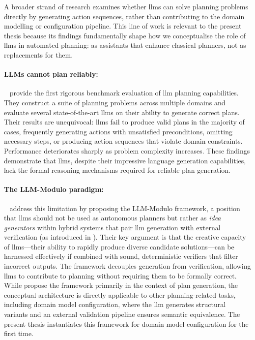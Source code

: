 A broader strand of research examines whether \glspl{llm} can solve planning problems directly by generating action sequences, rather than contributing to the domain modelling or configuration pipeline.
This line of work is relevant to the present thesis because its findings fundamentally shape how we conceptualise the role of \glspl{llm} in automated planning: as assistants that enhance classical planners, not as replacements for them.

\paragraph{LLMs cannot plan reliably:}
\citeauthor{Valmeekam2023}~\cite{Valmeekam2023} provide the first rigorous benchmark evaluation of \gls{llm} planning capabilities.
They construct a suite of planning problems across multiple domains and evaluate several state-of-the-art \glspl{llm} on their ability to generate correct plans.
Their results are unequivocal: \glspl{llm} fail to produce valid plans in the majority of cases, frequently generating actions with unsatisfied preconditions, omitting necessary steps, or producing action sequences that violate domain constraints.
Performance deteriorates sharply as problem complexity increases.
These findings demonstrate that \glspl{llm}, despite their impressive language generation capabilities, lack the formal reasoning mechanisms required for reliable plan generation.

\paragraph{The LLM-Modulo paradigm:}
\citeauthor{Kambhampati2024}~\cite{Kambhampati2024} address this limitation by proposing the LLM-Modulo framework, a position that \glspl{llm} should not be used as autonomous planners but rather as \emph{idea generators} within hybrid systems that pair \gls{llm} generation with external verification (as introduced in ).
Their key argument is that the creative capacity of \glspl{llm}---their ability to rapidly produce diverse candidate solutions---can be harnessed effectively if combined with sound, deterministic verifiers that filter incorrect outputs.
The framework decouples generation from verification, allowing \glspl{llm} to contribute to planning without requiring them to be formally correct.
While \citeauthor{Kambhampati2024} propose the framework primarily in the context of plan generation, the conceptual architecture is directly applicable to other planning-related tasks, including domain model configuration, where the \gls{llm} generates structural variants and an external validation pipeline ensures semantic equivalence.
The present thesis instantiates this framework for domain model configuration for the first time.

